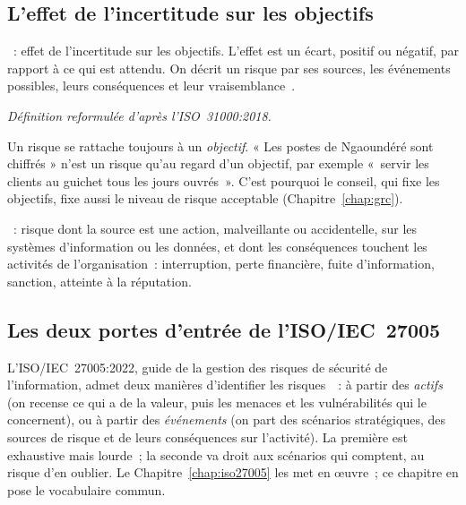 \subsection{L'effet de l'incertitude sur les objectifs}

\begin{boxdef}
~: effet de l'incertitude sur les objectifs.
L'effet est un écart, positif ou négatif, par rapport à ce qui est
attendu. On décrit un risque par ses sources, les événements possibles,
leurs conséquences et leur vraisemblance~\cite{iso31000_2018}.
\end{boxdef}
{\small\itshape Définition reformulée d'après l'ISO~31000:2018.}

\medskip

Un risque se rattache toujours à un \emph{objectif}. « Les postes de
Ngaoundéré sont chiffrés » n'est un risque qu'au regard d'un objectif, par
exemple «~servir les clients au guichet tous les jours ouvrés~». C'est
pourquoi le conseil, qui fixe les objectifs, fixe aussi le niveau de risque
acceptable (Chapitre~\ref{chap:grc}).

\begin{boxdef}
~: risque dont la source est
une action, malveillante ou accidentelle, sur les systèmes d'information
ou les données, et dont les conséquences touchent les activités de
l'organisation~: interruption, perte financière, fuite d'information,
sanction, atteinte à la réputation.
\end{boxdef}

\subsection{Les deux portes d'entrée de l'ISO/IEC~27005}

L'ISO/IEC~27005:2022, guide de la gestion des risques de sécurité de
l'information, admet deux manières d'identifier les
risques~\cite{iso27005_2022}~: à partir des \emph{actifs} (on recense ce
qui a de la valeur, puis les menaces et les vulnérabilités qui le
concernent), ou à partir des \emph{événements} (on part des scénarios
stratégiques, des sources de risque et de leurs conséquences sur
l'activité). La première est exhaustive mais lourde~; la seconde va
droit aux scénarios qui comptent, au risque d'en oublier. Le
Chapitre~\ref{chap:iso27005} les met en œuvre~; ce chapitre en pose le
vocabulaire commun.

